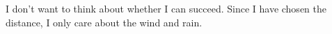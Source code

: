 
\enabstract

I don't want to think about whether I can succeed. Since I have chosen the distance, I only care about the wind and rain.



